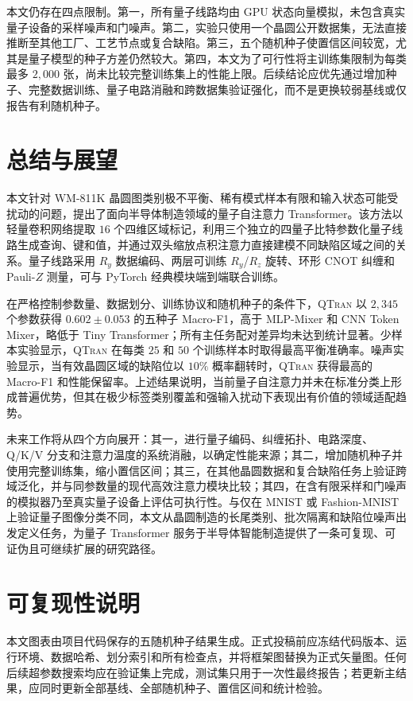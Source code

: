 \documentclass[journal]{IEEEtran}
\newcommand{\qtran}{\textsc{QTran}}
\newcommand{\wm}{\textsc{WM-811K}}
\begin{document}
本文仍存在四点限制。第一，所有量子线路均由 GPU 状态向量模拟，未包含真实量子设备的采样噪声和门噪声。第二，实验只使用一个晶圆公开数据集，无法直接推断至其他工厂、工艺节点或复合缺陷。第三，五个随机种子使置信区间较宽，尤其是量子模型的种子方差仍然较大。第四，本文为了可行性将主训练集限制为每类最多 $2{,}000$ 张，尚未比较完整训练集上的性能上限。后续结论应优先通过增加种子、完整数据训练、量子电路消融和跨数据集验证强化，而不是更换较弱基线或仅报告有利随机种子。

\section{总结与展望}
\label{sec:conclusion}

本文针对 \wm{} 晶圆图类别极不平衡、稀有模式样本有限和输入状态可能受扰动的问题，提出了面向半导体制造领域的量子自注意力 Transformer。该方法以轻量卷积网络提取 $16$ 个四维区域标记，利用三个独立的四量子比特参数化量子线路生成查询、键和值，并通过双头缩放点积注意力直接建模不同缺陷区域之间的关系。量子线路采用 $R_y$ 数据编码、两层可训练 $R_y$/$R_z$ 旋转、环形 CNOT 纠缠和 Pauli-$Z$ 测量，可与 PyTorch 经典模块端到端联合训练。

在严格控制参数量、数据划分、训练协议和随机种子的条件下，\qtran{} 以 $2{,}345$ 个参数获得 $0.602\pm0.053$ 的五种子 Macro-F1，高于 MLP-Mixer 和 CNN Token Mixer，略低于 Tiny Transformer；所有主任务配对差异均未达到统计显著。少样本实验显示，\qtran{} 在每类 $25$ 和 $50$ 个训练样本时取得最高平衡准确率。噪声实验显示，当有效晶圆区域的缺陷位以 $10\%$ 概率翻转时，\qtran{} 获得最高的 Macro-F1 和性能保留率。上述结果说明，当前量子自注意力并未在标准分类上形成普遍优势，但其在极少标签类别覆盖和强输入扰动下表现出有价值的领域适配趋势。

未来工作将从四个方向展开：其一，进行量子编码、纠缠拓扑、电路深度、Q/K/V 分支和注意力温度的系统消融，以确定性能来源；其二，增加随机种子并使用完整训练集，缩小置信区间；其三，在其他晶圆数据和复合缺陷任务上验证跨域泛化，并与同参数量的现代高效注意力模块比较；其四，在含有限采样和门噪声的模拟器乃至真实量子设备上评估可执行性。与仅在 MNIST 或 Fashion-MNIST 上验证量子图像分类不同，本文从晶圆制造的长尾类别、批次隔离和缺陷位噪声出发定义任务，为量子 Transformer 服务于半导体智能制造提供了一条可复现、可证伪且可继续扩展的研究路径。

\section*{可复现性说明}

本文图表由项目代码保存的五随机种子结果生成。正式投稿前应冻结代码版本、运行环境、数据哈希、划分索引和所有检查点，并将框架图替换为正式矢量图。任何后续超参数搜索均应在验证集上完成，测试集只用于一次性最终报告；若更新主结果，应同时更新全部基线、全部随机种子、置信区间和统计检验。
\end{document}
